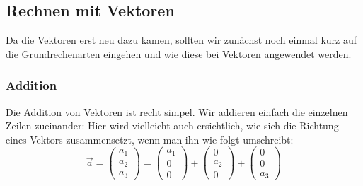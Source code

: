 \subsection{Rechnen mit Vektoren}
	Da die Vektoren erst neu dazu kamen, sollten wir zunächst noch einmal kurz auf
	die Grundrechenarten eingehen und wie diese bei Vektoren angewendet werden.

	\subsubsection{Addition}
		Die Addition von Vektoren ist recht simpel. Wir addieren einfach die einzelnen
		Zeilen zueinander:
		\formel{
			\[\vec{a}+\vec{b}=
			\begin{pmatrix}
			 a_1\\
			 a_2\\
			 a_3
			\end{pmatrix}+\begin{pmatrix}
			 b_1\\
			 b_2\\
			 b_3
			\end{pmatrix}
			=
			\begin{pmatrix}
			 a_1+b_1\\
			 a_2+b_2\\
			 a_3+b_3
			\end{pmatrix} \]
		}
		Hier wird vielleicht auch ersichtlich, wie sich die Richtung eines Vektors
		zusammensetzt, wenn man ihn wie folgt umschreibt:
		\[\vec{a}=
		\begin{pmatrix}
		 a_1\\
		 a_2\\
		 a_3
		\end{pmatrix}=
		\begin{pmatrix}
		 a_1\\
		 0\\
		 0
		\end{pmatrix} +
		\begin{pmatrix}
		 0\\
		 a_2\\
		 0
		\end{pmatrix} +
		\begin{pmatrix}
		 0\\
		 0\\
		 a_3
		\end{pmatrix}
		\]

